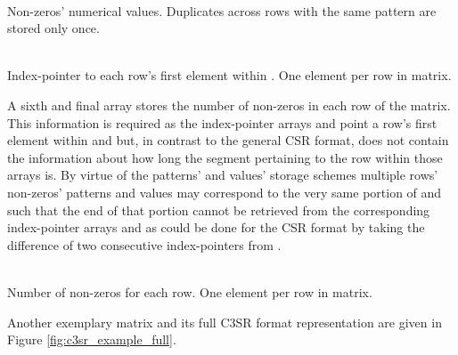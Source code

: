     \begin{description}[align = left, labelwidth = 4cm]
      \item [\V - \emph{Values}] \hfill \\
        Non-zeros' numerical values. Duplicates across rows with the same pattern are stored only once.
      \item [\VS - \emph{Values' index-pointers}] \hfill \\
        Index-pointer to each row's first element within \V. One element per row in matrix.
    \end{description}

    A sixth and final array \RS stores the number of non-zeros in each row of the matrix. This information is required as the index-pointer arrays \JS and \VS point a row's first element within \J and \V but, in contrast to the general CSR format, does not contain the information about how long the segment pertaining to the row within those arrays is. By virtue of the patterns' and values' storage schemes multiple rows' non-zeros' patterns and values may correspond to the very same portion of \J and \V such that the end of that portion cannot be retrieved from the corresponding index-pointer arrays \JS and \VS as could be done for the CSR format by taking the difference of two consecutive index-pointers from \RP.

    \begin{description}[align = left, labelwidth = 4cm]
      \item [\RS - \emph{Row sizes}] \hfill \\
        Number of non-zeros for each row. One element per row in matrix.
    \end{description}

    Another exemplary matrix and its full C3SR format representation are given in Figure \ref{fig:c3sr_example_full}.

